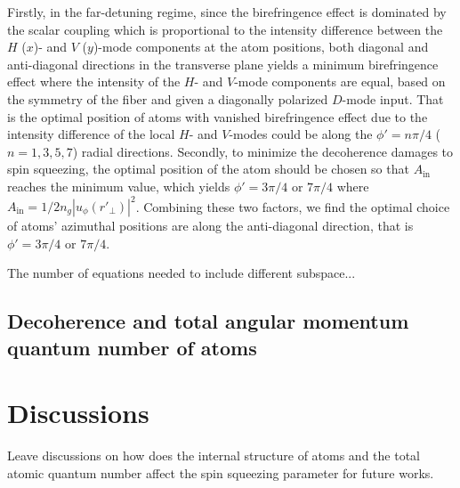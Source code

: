 \documentclass[preprint,aps,pra,onecolumn,superscriptaddress]{revtex4-1} %
\newcommand{\comment}[1]{{\color{Maroon} #1}}
\begin{document}
Firstly, in the far-detuning regime, since the birefringence effect is dominated by the scalar coupling which is proportional to the intensity difference between the $H$ ($x$)- and $V$ ($ y $)-mode components at the atom positions, both diagonal and anti-diagonal directions in the transverse plane yields a minimum birefringence effect where the intensity of the $ H $- and $ V $-mode components are equal, based on the symmetry of the fiber and given a diagonally polarized $ D $-mode input.
That is the optimal position of atoms with vanished birefringence effect due to the intensity difference of the local $ H $- and $ V $-modes could be along the $ \phi'=n\pi/4 $ ($ n=1,3,5,7 $) radial directions. 
Secondly, to minimize the decoherence damages to spin squeezing, the optimal position of the atom should be chosen so that $ A_{\mathrm{in}} $ reaches the minimum value, which yields $ \phi'=3\pi/4 $ or $ 7\pi/4 $ where $ A_{\mathrm{in}}=1/2n_g|u_\phi(r'\!_\perp)|^2 $.
Combining these two factors, we find the optimal choice of atoms' azimuthal positions are along the anti-diagonal direction, that is $\phi'=3\pi/4 $ or $ 7\pi/4 $.

The number of equations needed to include different subspace...

\subsection{Decoherence and total angular momentum quantum number of atoms}

\section{Discussions} \label{Sec::Discussions}
\comment{Leave discussions on how does the internal structure of atoms and the total atomic quantum number affect the spin squeezing parameter for future works.}


\renewcommand{\thesubfigure}{(\alph{subfigure})}
\end{document}
